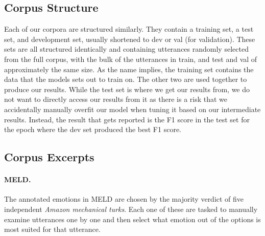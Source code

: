 \documentclass[nofilelist]{cslthse-msc}
\begin{document}
\subsection{Corpus Structure}
Each of our corpora are structured similarly. They contain a training set, a test set, and development set, usually shortened to dev or val (for validation). These sets are all structured identically and containing utterances randomly selected from the full corpus, with the bulk of the utterances in train, and test and val of approximately the same size. As the name implies, the training set contains the data that the models sets out to train on. The other two are used together to produce our results. While the test set is where we get our results from, we do not want to directly access our results from it as there is a risk that we accidentally manually overfit our model when tuning it based on our intermediate results. Instead, the result that gets reported is the F1 score in the test set for the epoch where the dev set produced the best F1 score. 


\subsection{Corpus Excerpts}

\paragraph{MELD.} The annotated emotions in MELD are chosen by the majority verdict of five independent \textit{Amazon mechanical turks}. Each one of these are tasked to manually examine utterances one by one and then select what emotion out of the options is most suited for that utterance.
\newenvironment{pag}{\fontfamily{pag}\selectfont}{\par}
\end{document}
